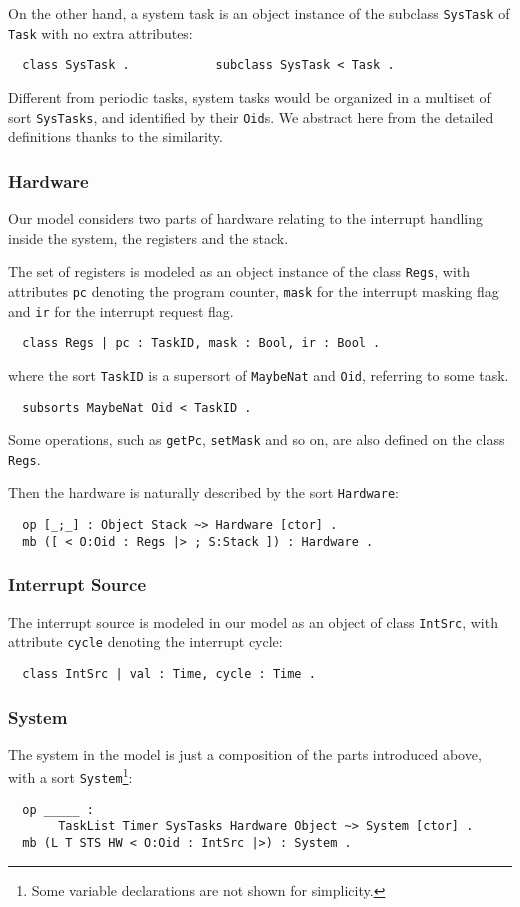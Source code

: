 \documentclass{llncs}
\begin{document}
On the other hand, a system task is an object instance of the subclass
\verb|SysTask| of \verb|Task| with no extra attributes:
\begin{verbatim}
  class SysTask .            subclass SysTask < Task .
\end{verbatim}
Different from periodic tasks, system tasks would be organized in a
multiset of sort \verb|SysTasks|, and identified by their \verb|Oid|s.
We abstract here from the detailed definitions thanks to the
similarity.

\subsubsection{Hardware} Our model considers two parts of hardware relating
to the interrupt handling inside the system, the registers and the
stack.

The set of registers is modeled as an object instance of the class
\verb|Regs|, with attributes \verb|pc| denoting the program counter,
\verb|mask| for the interrupt masking flag and \verb|ir| for the
interrupt request flag.
\begin{verbatim}
  class Regs | pc : TaskID, mask : Bool, ir : Bool .
\end{verbatim}
where the sort \verb|TaskID| is a supersort of \verb|MaybeNat| and
\verb|Oid|, referring to some task.
\begin{verbatim}
  subsorts MaybeNat Oid < TaskID .
\end{verbatim}

Some operations, such as \verb|getPc|, \verb|setMask| and so on, are
also defined on the class \verb|Regs|.

Then the hardware is naturally described by the sort \verb|Hardware|:
\begin{verbatim}
  op [_;_] : Object Stack ~> Hardware [ctor] .
  mb ([ < O:Oid : Regs |> ; S:Stack ]) : Hardware .
\end{verbatim}

\subsubsection{Interrupt Source}
The interrupt source is modeled in our model as an object of class \verb|IntSrc|,
with attribute \verb|cycle| denoting the interrupt cycle:
\begin{verbatim}
  class IntSrc | val : Time, cycle : Time .
\end{verbatim}

\subsubsection{System}
The system in the model is just a composition of the parts introduced
above, with a sort \verb|System|\footnote{Some variable declarations
  are not shown for simplicity.}:
\begin{verbatim}
  op _____ : 
       TaskList Timer SysTasks Hardware Object ~> System [ctor] .
  mb (L T STS HW < O:Oid : IntSrc |>) : System .
\end{verbatim}
\end{document}
